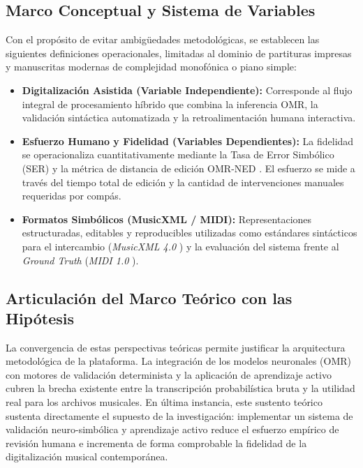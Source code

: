 \subsection{Marco Conceptual y Sistema de Variables}
\label{sec:marco-conceptual-variables}

Con el prop\'osito de evitar ambig\"uedades metodol\'ogicas, se establecen las siguientes definiciones operacionales, limitadas al dominio de partituras impresas y manuscritas modernas de complejidad monof\'onica o piano simple:
\begin{itemize}
    \item \textbf{Digitalizaci\'on Asistida (Variable Independiente):} Corresponde al flujo integral de procesamiento h\'ibrido que combina la inferencia OMR, la validaci\'on sint\'actica automatizada y la retroalimentaci\'on humana interactiva.
    \item \textbf{Esfuerzo Humano y Fidelidad (Variables Dependientes):} La fidelidad se operacionaliza cuantitativamente mediante la Tasa de Error Simb\'olico (SER) y la m\'etrica de distancia de edici\'on OMR-NED \cite{smb2026}. El esfuerzo se mide a trav\'es del tiempo total de edici\'on y la cantidad de intervenciones manuales requeridas por comp\'as.
    \item \textbf{Formatos Simb\'olicos (MusicXML / MIDI):} Representaciones estructuradas, editables y reproducibles utilizadas como est\'andares sint\'acticos para el intercambio (\emph{MusicXML 4.0} \cite{musicxml2021}) y la evaluaci\'on del sistema frente al \emph{Ground Truth} (\emph{MIDI 1.0} \cite{midi1996}).
\end{itemize}

\subsection{Articulaci\'on del Marco Te\'orico con las Hip\'otesis}
\label{sec:articulacion-hipotesis}

La convergencia de estas perspectivas te\'oricas permite justificar la arquitectura metodol\'ogica de la plataforma. La integraci\'on de los modelos neuronales (OMR) con motores de validaci\'on determinista y la aplicaci\'on de aprendizaje activo cubren la brecha existente entre la transcripci\'on probabil\'istica bruta y la utilidad real para los archivos musicales. En \'ultima instancia, este sustento te\'orico sustenta directamente el supuesto de la investigaci\'on: implementar un sistema de validaci\'on neuro-simb\'olica y aprendizaje activo reduce el esfuerzo emp\'irico de revisi\'on humana e incrementa de forma comprobable la fidelidad de la digitalizaci\'on musical contempor\'anea.
